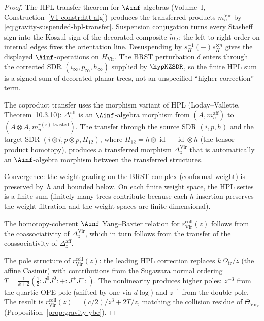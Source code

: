 \begin{proof}
The HPL transfer theorem for $\Ainf$ algebras
(Volume~I, Construction~\ref*{V1-constr:htt-alg})
produces the transferred products \(m_n^{\mathrm{Vir}}\) by
\eqref{eq:gravity-suspended-hpl-transfer}.  Suspension conjugation
turns every Stasheff sign into the Koszul sign of the decorated
composite \(\widetilde m_T\); the left-to-right order on internal
edges fixes the orientation line.  Desuspending by
\(s_H^{-1}(-)s_H^{\otimes n}\) gives the displayed
\(\Ainf\)-operations on \(H_{\mathrm{Vir}}\).  The BRST perturbation
\(\delta\) enters through the corrected SDR
\((i_\infty,p_\infty,h_\infty)\) supplied by \(\hypKZSDR\), so the
finite HPL sum is a signed sum of decorated planar trees, not an
unspecified ``higher correction'' term.

The coproduct transfer uses the morphism variant of HPL
(Loday--Vallette, Theorem~10.3.10):
$\Delta_z^{\mathrm{aff}}$ is an $\Ainf$-algebra morphism
from $(A, m_n^{\mathrm{aff}})$ to
$(A \otimes A, m_n^{r(z)\text{-twisted}})$.
The transfer through the source SDR $(i,p,h)$ and the target
SDR $(i \otimes i, p \otimes p, H_{12})$, where
$H_{12} = h \otimes \operatorname{id}
+ \operatorname{id} \otimes h$
(the tensor product homotopy), produces a transferred morphism
$\Delta_z^{\mathrm{Vir}}$ that is automatically an
$\Ainf$-algebra morphism between the transferred structures.

Convergence: the weight grading on the BRST complex
(conformal weight) is preserved by~$h$ and bounded below.
On each finite weight space, the HPL series is a finite sum
(finitely many trees contribute because each $h$-insertion
preserves the weight filtration and the weight spaces are
finite-dimensional).

The homotopy-coherent $\Ainf$ Yang--Baxter relation for
\(r_{\mathrm{Vir}}^{\mathrm{coll}}(z)\) follows from the
coassociativity of $\Delta_z^{\mathrm{Vir}}$, which in turn
follows from the transfer of the coassociativity of
$\Delta_z^{\mathrm{aff}}$.

The pole structure of \(r_{\mathrm{Vir}}^{\mathrm{coll}}(z)\): the leading
HPL correction replaces $k\,\Omega_{\mathrm{tr}}/z$ (the affine Casimir)
with contributions from the Sugawara normal ordering
$T = \frac{1}{k+2}(\frac{1}{2}:J^0 J^0: + :J^+ J^-:)$.
The nonlinearity produces higher poles: $z^{-3}$ from the
quartic OPE pole (shifted by one via $d\log$) and $z^{-1}$
from the double pole. The result is
\(r_{\mathrm{Vir}}^{\mathrm{coll}}(z) = (c/2)/z^3 + 2T/z\), matching
the collision residue of $\Theta_{\mathrm{Vir}_c}$
(Proposition~\ref{prop:gravity-ybe}).
\end{proof}

